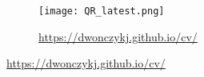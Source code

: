 \documentclass[a4paper,11pt]{article}
\begin{document}

\begin{figure}[h!]
    \centering
    
    
    \hfill
    
    \begin{subfigure}[b]{0.4\textwidth}  %
        \centering
        \texttt{[image: QR\_latest.png]}
        \caption{\href{https://dwonczykj.github.io/cv/}{https://dwonczykj.github.io/cv/}}
    \end{subfigure}

\end{figure}
\end{document}
